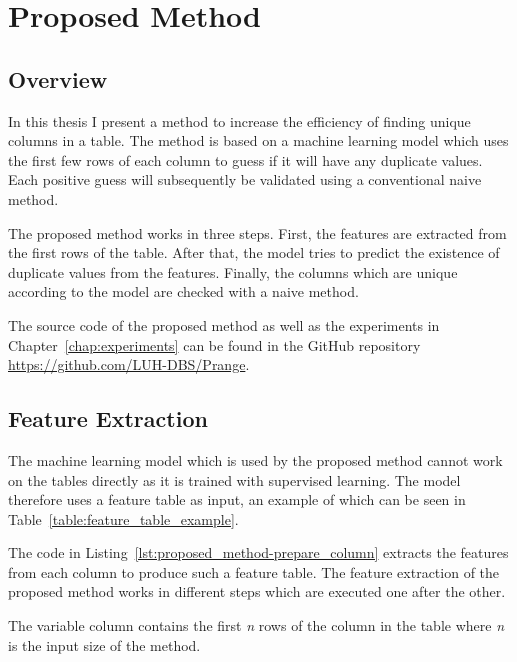 \chapter{Proposed Method}\label{chap:proposed_method}
\section{Overview}\label{sec:overview}
In this thesis I present a method to increase the efficiency of finding unique columns in a table. The method is based on a machine learning model which uses the first few rows of each column to guess if it will have any duplicate values. Each positive guess will subsequently be validated using a conventional naive method.

The proposed method works in three steps. First, the features are extracted from the first rows of the table. After that, the model tries to predict the existence of duplicate values from the features. Finally, the columns which are unique according to the model are checked with a naive method.

The source code of the proposed method as well as the experiments in Chapter~\ref{chap:experiments} can be found in the GitHub repository \url{https://github.com/LUH-DBS/Prange}.

\section{Feature Extraction}\label{sec:extracted_features}
The machine learning model which is used by the proposed method cannot work on the tables directly as it is trained with supervised learning. The model therefore uses a feature table as input, an example of which can be seen in Table~\ref{table:feature_table_example}.



The code in Listing~\ref{lst:proposed_method-prepare_column} extracts the features from each column to produce such a feature table. The feature extraction of the proposed method works in different steps which are executed one after the other.

The variable column contains the first \textit{n} rows of the column in the table where \textit{n} is the input size of the method.

